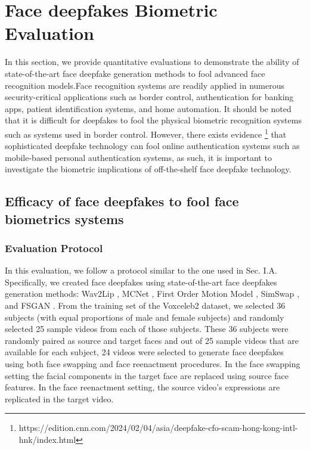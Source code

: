\section{Face deepfakes Biometric Evaluation}
In this section, we provide quantitative evaluations to demonstrate the ability of state-of-the-art face deepfake generation methods to fool advanced face recognition models.Face recognition systems are readily applied in numerous security-critical applications such as border control, authentication for banking apps, patient identification systems, and home automation. It should be noted that it is difficult for deepfakes to fool the physical biometric recognition systems such as systems used in border control. However, there exists evidence \footnote{https://edition.cnn.com/2024/02/04/asia/deepfake-cfo-scam-hong-kong-intl-hnk/index.html} that sophisticated deepfake technology can fool online authentication systems such as mobile-based personal authentication systems, as such, it is important to investigate the biometric implications of off-the-shelf face deepfake technology.

\subsection{Efficacy of face deepfakes to fool face biometrics systems}

\subsubsection{Evaluation Protocol}
In this evaluation, we follow a protocol similar to the one used in Sec. I.A. Specifically, we created face deepfakes using state-of-the-art face deepfakes generation methods: Wav2Lip \cite{chung2017out},  MCNet \cite{hong2023implicit}, First Order Motion Model \cite{siarohin2019first}, SimSwap \cite{chen2020simswap}, and FSGAN \cite{nirkin2022fsganv2}. From the training set of the Voxceleb2 \cite{nagrani2020voxceleb} dataset, we selected 36 subjects (with equal proportions of male and female subjects) and randomly selected 25 sample videos from each of those subjects. These 36 subjects were randomly paired as source and target faces and out of 25 sample videos that are available for each subject, 24 videos were selected to generate face deepfakes using both face swapping and face reenactment procedures. In the face swapping setting the facial components in the target face are replaced using source face features. In the face reenactment setting, the source video's expressions are replicated in the target video. 

